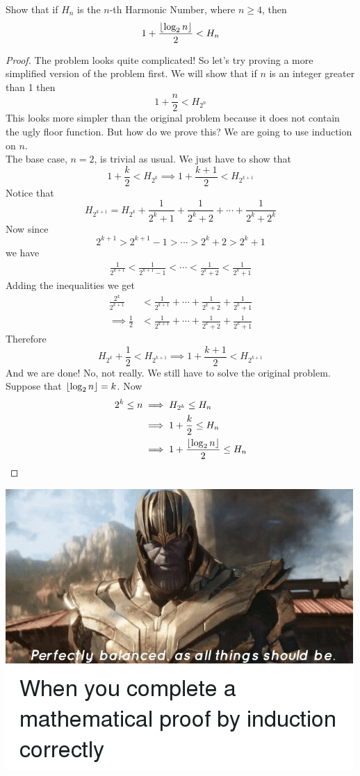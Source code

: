 \documentclass[11pt,numbers=noenddot,svgnames,dvipsnames]{scrartcl}
\begin{document}
\begin{example}
    Show that if $H_{n}$ is the $n$-th Harmonic Number, where $n\geq 4$, then 
    \[
        1 + \frac{\left\lfloor \log_{2} n \right\rfloor}{2} < H_{n}
    \]
\end{example}
\begin{proof}
    The problem looks quite complicated! So let's try proving a more simplified version of the problem first. 
    We will show that if $n$ is an integer greater than 1 then
    \[
        1 + \frac{n}{2} < H_{2^{n}}
    \]
    This looks more simpler than the original problem because it does not contain the ugly floor function. 
    But how do we prove this? We are going to use induction on $n$. \\
    The base case, $n = 2$, is trivial as usual. We just have to show that 
    \[
        1 + \frac{k}{2} < H_{2^{k}} \implies 1 + \frac{k + 1}{2} < H_{2^{k + 1}}
    \]
    Notice that 
    \[
        H_{2^{k + 1}} = H_{2^{k}} + \frac{1}{2^{k} + 1} + \frac{1}{2^{k} + 2} + \cdots + \frac{1}{2^{k} + 2^{k}}
    \]
    Now since 
    \[
        2^{k + 1} > 2^{k + 1} - 1 > \cdots > 2^{k} + 2 > 2^{k} + 1
    \]
    we have 
    \begin{align*}
        \frac{1}{2^{k + 1}} < \frac{1}{2^{k + 1} - 1} < \cdots < \frac{1}{2^{k} + 2} < \frac{1}{2^{k} + 1}
    \end{align*}
    Adding the inequalities we get 
    \begin{align*}
        \frac{2^{k}}{2^{k + 1}} &< \frac{1}{2^{k + 1}} + \cdots + \frac{1}{2^{k} + 2} + \frac{1}{2^{k} + 1} \\
        \implies \frac{1}{2} &< \frac{1}{2^{k + 1}} + \cdots + \frac{1}{2^{k} + 2} + \frac{1}{2^{k} + 1}
    \end{align*}
    Therefore 
    \[
        H_{2^{k}} + \frac{1}{2} < H_{2^{k+1}} \implies 1 + \frac{k + 1}{2} < H_{2^{k + 1}}
    \]
    And we are done! No, not really. We still have to solve the original problem. \\
    Suppose that $\left\lfloor \log_{2} n \right\rfloor = k$. Now
    \begin{align*}
        2^{k} \leq n & \implies H_{2^{k}} \leq H_{n} \\
                     & \implies 1 + \frac{k}{2} \leq H_{n} \\
                     & \implies 1 + \frac{\left\lfloor \log_{2} n \right\rfloor}{2} \leq H_{n}
    \end{align*}
\end{proof}
\begin{center}
\includegraphics[scale=.35]{induction-meme-0.png}
\end{center}
\end{document}
